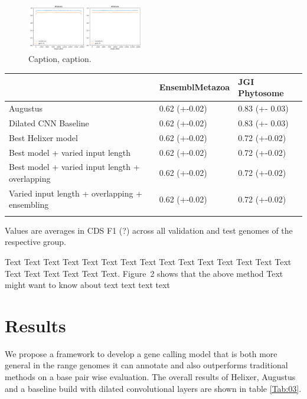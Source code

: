 \documentclass{bioinfo}
\begin{document}
\begin{figure}[!tpb]
	\centerline{\includegraphics[width=0.45\textwidth]{images/length_wise_bias}}
\caption{Caption, caption.}\label{fig:length_wise_bias}
\end{figure}


\begin{table}[!t]
 {
\begin{tabular}{@{}lll@{}}
\toprule & EnsemblMetazoa & JGI Phytosome\\
\midrule
Augustus & 0.62 (+-0.02) & 0.83 (+- 0.03)\\
Dilated CNN Baseline & 0.62 (+-0.02) & 0.83 (+- 0.03)\\
Best Helixer model & 0.62 (+-0.02) & 0.72 (+-0.02) \\
Best model + varied input length & 0.62 (+-0.02) & 0.72 (+-0.02) \\
Best model + varied input length + overlapping & 0.62 (+-0.02) & 0.72 (+-0.02) \\
Varied input length + overlapping + ensembling & 0.62 (+-0.02) & 0.72 (+-0.02) \\
\botrule
\end{tabular}}{Values are averages in CDS F1 (?) across all validation and test genomes of the \\ respective group.}
\end{table}

Text Text Text Text Text Text  Text Text Text Text Text Text Text
Text Text  Text Text Text Text Text Text.
Figure~2\vphantom{\ref{fig:02}} shows that the above method  Text
\citealp{Boffelli03} might want to know about  text text text text

\section{Results}

We propose a framework to develop a gene calling model that is both more general in the range genomes it can annotate and also outperforms traditional methods on a base pair wise evaluation. The overall results of Helixer, Augustus and a baseline build with dilated convolutional layers are shown in table \ref{Tab:03}.
\end{document}
